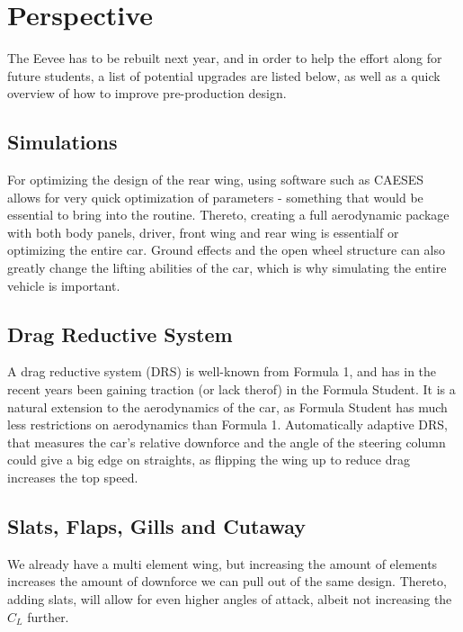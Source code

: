 \chapter{Perspective}
\label{chap:perspective}

The Eevee has to be rebuilt next year, and in order to help the effort along for future students, a list of potential upgrades are listed below, as well as a quick overview of how to improve pre-production design.

\section{Simulations}

For optimizing the design of the rear wing, using software such as CAESES allows for very quick optimization of parameters - something that would be essential to bring into the routine. Thereto, creating a full aerodynamic package with both body panels, driver, front wing and rear wing is essentialf or optimizing the entire car. Ground effects and the open wheel structure can also greatly change the lifting abilities of the car, which is why simulating the entire vehicle is important.

\section{Drag Reductive System}

A drag reductive system (DRS) is well-known from Formula 1, and has in the recent years been gaining traction (or lack therof) in the Formula Student. It is a natural extension to the aerodynamics of the car, as Formula Student has much less restrictions on aerodynamics than Formula 1. Automatically adaptive DRS, that measures the car's relative downforce and the angle of the steering column could give a big edge on straights, as flipping the wing up to reduce drag increases the top speed.

\section{Slats, Flaps, Gills and Cutaway}


We already have a multi element wing, but increasing the amount of elements increases the amount of downforce we can pull out of the same design. Thereto, adding slats, will allow for even higher angles of attack, albeit not increasing the $C_L$ further.

